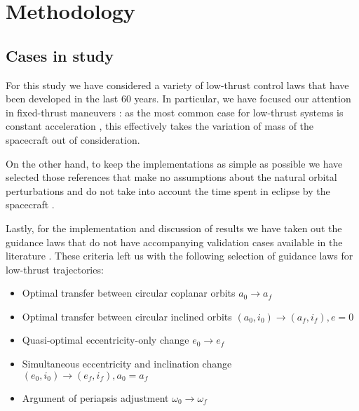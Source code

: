\section{Methodology} \label{methodology}

\subsection{Cases in study} \label{cases}

For this study we have considered a variety of low-thrust control
laws that have been developed in the last 60 years. In particular,
we have focused our attention in fixed-thrust maneuvers : as the most common case for
low-thrust systems is constant acceleration , this 
effectively takes the variation of mass of the spacecraft out of 
consideration.

On the other hand, to keep the implementations as simple 
as possible  we 
have selected those references that make no assumptions about the 
natural orbital perturbations and do not take into account the time 
spent in eclipse by the spacecraft .

Lastly, for the implementation and discussion of 
results we have taken out the guidance laws that do not have 
accompanying validation cases available in the literature . These criteria left us with the following selection of guidance laws for low-thrust trajectories:


\begin{itemize}
\item Optimal transfer between circular coplanar orbits $a_0 \rightarrow a_f$ \cite{edelbaum1961propulsion,burt1967space}
\item Optimal transfer between circular inclined orbits $(a_0, i_0) \rightarrow (a_f, i_f), e = 0$ \cite{edelbaum1961propulsion,kechichian1997reformulation}
\item Quasi-optimal eccentricity-only change $e_0 \rightarrow e_f$ \cite{pollard1997simplified}
\item Simultaneous eccentricity and inclination change $(e_0, i_0) \rightarrow (e_f, i_f), a_0 = a_f$ \cite{pollard2000simplified}
\item Argument of periapsis adjustment $\omega_0 \rightarrow \omega_f$ \cite{pollard1998evaluation}
\end{itemize}

